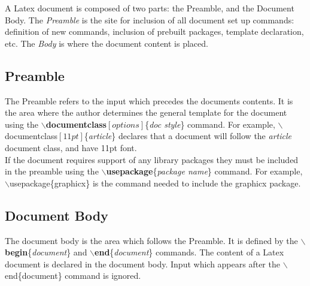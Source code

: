 A Latex document is composed of two parts: the Preamble, and the Document Body.  The \textit{Preamble} is the site for inclusion of all document set up commands: definition of new commands, inclusion of pre\-built packages, template declaration, etc.  The \textit{Body} is where the document content is placed.

\subsection{Preamble}
 The Preamble refers to the input which precedes the documents contents.  It is the area where the author determines the general template for the document using the \textbf{$\backslash$documentclass}$[options]$\{\textit{doc style}\} command.  For example,
 $\backslash$documentclass$[11pt]$\{\textit{article}\} declares that a document will follow the \textit{article} document class, and have 11pt font.
 \newline\\
 If the document requires support of any library packages they must be included in the preamble using the \textbf{$\backslash$usepackage}\{\textit{package name}\} command. For example, $\backslash$usepackage\{graphicx\} is the command needed to include the graphicx package.

\subsection{Document Body}
The document body is the area which follows the Preamble. It is defined by the \textbf{$\backslash$begin}\{\textit{document}\} and \textbf{$\backslash$end}\{\textit{document}\} commands.  The content of a Latex document is declared in the document body.  Input which appears after the $\backslash$end\{document\} command is ignored.

